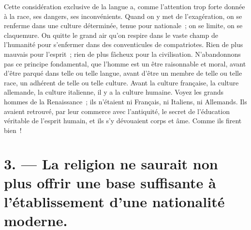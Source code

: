 \documentclass[french,twoside]{book} %
\begin{document}
Cette considération exclusive de la langue a, comme l’attention trop forte donnée à la race, ses dangers, ses inconvénients. Quand on y met de l’exagération, on se renferme dans une culture déterminée, tenue pour nationale ; on se limite, on se claquemure. On quitte le grand air qu’on respire dans le vaste champ de l’humanité pour s’enfermer dans des conventicules de compatriotes. Rien de plus mauvais pour l’esprit ; rien de plus fâcheux pour la civilisation. N’abandonnons pas ce principe fondamental, que l’homme est un être raisonnable et moral, avant d’être parqué dans telle ou telle langue, avant d’être un membre de telle ou telle race, un adhérent de telle ou telle culture. Avant la culture française, la culture allemande, la culture italienne, il y a la culture humaine. Voyez les grands hommes de la Renaissance ; ils n’étaient ni Français, ni Italiens, ni Allemands. Ils avaient retrouvé, par leur commerce avec l’antiquité, le secret de l’éducation véritable de l’esprit humain, et ils s’y dévouaient corps et âme. Comme ils firent bien !

\section[{3. — La religion ne saurait non plus offrir une base suffisante à l’établissement d’une nationalité moderne.}]{3. — La religion ne saurait non plus offrir une base suffisante à l’établissement d’une nationalité moderne.}
\end{document}
